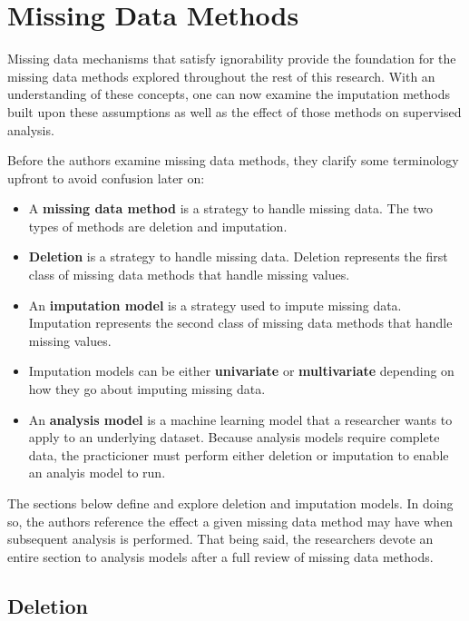 \documentclass[12pt,oneside]{chicagocapstone}
\providecommand{\tightlist}{%
  \setlength{\itemsep}{0pt}\setlength{\parskip}{0pt}}
\begin{document}
\section*{Missing Data Methods}\label{background-missing-data-methods}

Missing data mechanisms that satisfy ignorability provide the foundation
for the missing data methods explored throughout the rest of this
research. With an understanding of these concepts, one can now examine
the imputation methods built upon these assumptions as well as the
effect of those methods on supervised analysis.

Before the authors examine missing data methods, they clarify some
terminology upfront to avoid confusion later on:
\begin{itemize}
\tightlist
\item
  A \textbf{missing data method} is a strategy to handle missing data.
  The two types of methods are deletion and imputation.
\item
  \textbf{Deletion} is a strategy to handle missing data. Deletion
  represents the first class of missing data methods that handle missing
  values.
\item
  An \textbf{imputation model} is a strategy used to impute missing
  data. Imputation represents the second class of missing data methods
  that handle missing values.
\item
  Imputation models can be either \textbf{univariate} or
  \textbf{multivariate} depending on how they go about imputing missing
  data.
\item
  An \textbf{analysis model} is a machine learning model that a
  researcher wants to apply to an underlying dataset. Because analysis
  models require complete data, the practicioner must perform either
  deletion or imputation to enable an analyis model to run.
\end{itemize}
The sections below define and explore deletion and imputation models. In
doing so, the authors reference the effect a given missing data method
may have when subsequent analysis is performed. That being said, the
researchers devote an entire section to analysis models after a full
review of missing data methods.

\hypertarget{background-deletion}{\subsection*{Deletion}\label{background-deletion}}
\end{document}

